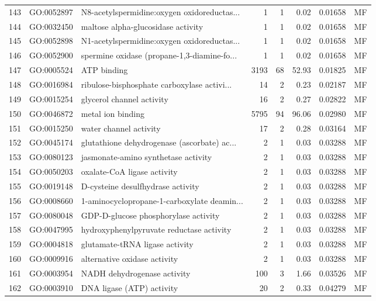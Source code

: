 \documentclass[12pt,oneside,a4paper]{article}
\begin{document}
\begin{longtable}{rllrrrll}
  143 & GO:0052897 & N8-acetylspermidine:oxygen oxidoreductas... &   1 &   1 & 0.02 & 0.01658 & MF \\ 
  144 & GO:0032450 & maltose alpha-glucosidase activity &   1 &   1 & 0.02 & 0.01658 & MF \\ 
  145 & GO:0052898 & N1-acetylspermidine:oxygen oxidoreductas... &   1 &   1 & 0.02 & 0.01658 & MF \\ 
  146 & GO:0052900 & spermine oxidase (propane-1,3-diamine-fo... &   1 &   1 & 0.02 & 0.01658 & MF \\ 
  147 & GO:0005524 & ATP binding & 3193 &  68 & 52.93 & 0.01825 & MF \\ 
  148 & GO:0016984 & ribulose-bisphosphate carboxylase activi... &  14 &   2 & 0.23 & 0.02187 & MF \\ 
  149 & GO:0015254 & glycerol channel activity &  16 &   2 & 0.27 & 0.02822 & MF \\ 
  150 & GO:0046872 & metal ion binding & 5795 &  94 & 96.06 & 0.02980 & MF \\ 
  151 & GO:0015250 & water channel activity &  17 &   2 & 0.28 & 0.03164 & MF \\ 
  152 & GO:0045174 & glutathione dehydrogenase (ascorbate) ac... &   2 &   1 & 0.03 & 0.03288 & MF \\ 
  153 & GO:0080123 & jasmonate-amino synthetase activity &   2 &   1 & 0.03 & 0.03288 & MF \\ 
  154 & GO:0050203 & oxalate-CoA ligase activity &   2 &   1 & 0.03 & 0.03288 & MF \\ 
  155 & GO:0019148 & D-cysteine desulfhydrase activity &   2 &   1 & 0.03 & 0.03288 & MF \\ 
  156 & GO:0008660 & 1-aminocyclopropane-1-carboxylate deamin... &   2 &   1 & 0.03 & 0.03288 & MF \\ 
  157 & GO:0080048 & GDP-D-glucose phosphorylase activity &   2 &   1 & 0.03 & 0.03288 & MF \\ 
  158 & GO:0047995 & hydroxyphenylpyruvate reductase activity &   2 &   1 & 0.03 & 0.03288 & MF \\ 
  159 & GO:0004818 & glutamate-tRNA ligase activity &   2 &   1 & 0.03 & 0.03288 & MF \\ 
  160 & GO:0009916 & alternative oxidase activity &   2 &   1 & 0.03 & 0.03288 & MF \\ 
  161 & GO:0003954 & NADH dehydrogenase activity & 100 &   3 & 1.66 & 0.03526 & MF \\ 
  162 & GO:0003910 & DNA ligase (ATP) activity &  20 &   2 & 0.33 & 0.04279 & MF \\ 

\end{longtable}
\end{document}
